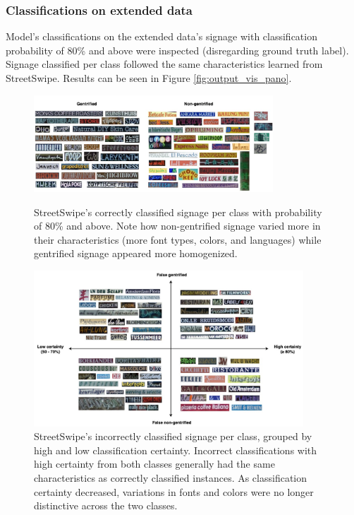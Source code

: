 \subsubsection{Classifications on extended data}

Model's classifications on the extended data's signage with classification probability of 80\% and above were inspected (disregarding ground truth label). Signage classified per class followed the same characteristics learned from StreetSwipe. Results can be seen in Figure \ref{fig:output_vis_pano}.


\begin{figure}[]
    \centering
    \includegraphics[width=0.8\textwidth]{media/results/output_vis-SS_correct1.jpg}
        \caption{StreetSwipe's correctly classified signage per class with probability of 80\% and above. Note how non-gentrified signage varied more in their characteristics (more font types, colors, and languages) while gentrified signage appeared more homogenized.}
        \label{fig:output_vis}
    \includegraphics[width=0.9\textwidth]{media/results/output_vis-SS_incorrect.jpg}
        \caption{StreetSwipe's incorrectly classified signage per class, grouped by high and low classification certainty. Incorrect classifications with high certainty from both classes generally had the same characteristics as correctly classified instances. As classification certainty decreased, variations in fonts and colors were no longer distinctive across the two classes.}

\end{figure}

